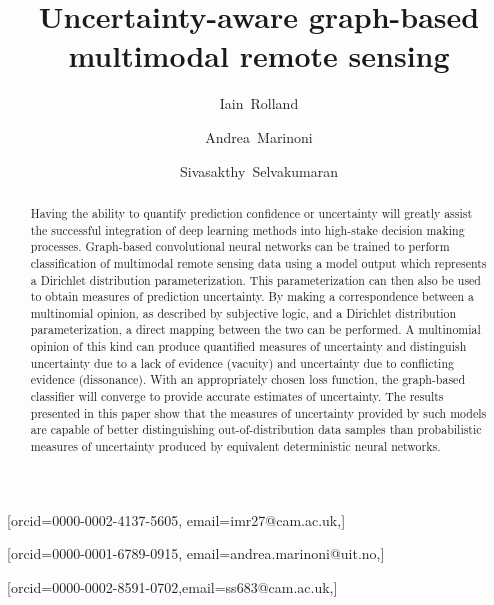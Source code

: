 \documentclass[
twocolumn,
]{ceurart}
\begin{document}


\title{Uncertainty-aware graph-based multimodal remote sensing}

\author[1]{Iain~Rolland}[orcid=0000-0002-4137-5605, email=imr27@cam.ac.uk,]

\address[1]{Department of Engineering, University of Cambridge, Cambridge, CB2 1PZ United Kingdom}
\address[2]{Department of Physics and Technology, UiT the Arctic University of Norway, P.O. box 6050 Langnes, NO-9037, Tromsø, Norway}

\author[1,2]{Andrea~Marinoni}[orcid=0000-0001-6789-0915, email=andrea.marinoni@uit.no,]

\author[1]{Sivasakthy~Selvakumaran}[orcid=0000-0002-8591-0702,email=ss683@cam.ac.uk,]

\begin{abstract}
Having the ability to quantify prediction confidence or uncertainty will greatly assist the successful integration of deep learning methods into high-stake decision making processes.
Graph-based convolutional neural networks can be trained to perform classification of multimodal remote sensing data using a model output which represents a Dirichlet distribution parameterization.
This parameterization can then also be used to obtain measures of prediction uncertainty.
By making a correspondence between a multinomial opinion, as described by subjective logic, and a Dirichlet distribution parameterization, a direct mapping between the two can be performed.
A multinomial opinion of this kind can produce quantified measures of uncertainty and distinguish uncertainty due to a lack of evidence (vacuity) and uncertainty due to conflicting evidence (dissonance).
With an appropriately chosen loss function, the graph-based classifier will converge to provide accurate estimates of uncertainty.
The results presented in this paper show that the measures of uncertainty provided by such models are capable of better distinguishing out-of-distribution data samples than probabilistic measures of uncertainty produced by equivalent deterministic neural networks.
\end{abstract}
\end{document}
